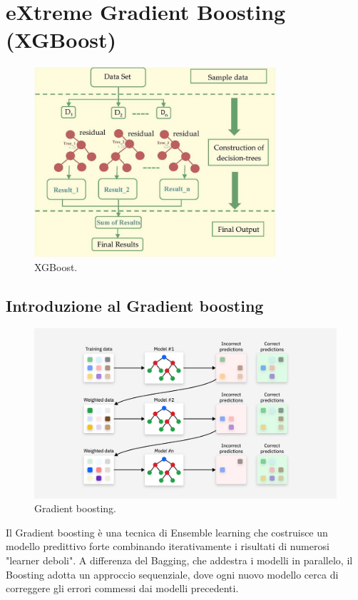 \documentclass[a4paper,12pt]{report}
\begin{document}
	\chapter{eXtreme Gradient Boosting (XGBoost)}
	\begin{figure}[H]
		\centering
		\includegraphics[width=0.8\textwidth]{img/xgb.png}
		\caption{XGBoost.}
	\end{figure}
	
	\section{Introduzione al Gradient boosting}
	\begin{figure}[H]
		\centering
		\includegraphics[width=1.0\textwidth]{img/grad_boost.png}
		\caption{Gradient boosting.}
	\end{figure}
	
	Il Gradient boosting è una tecnica di Ensemble learning che costruisce un modello predittivo forte combinando iterativamente i risultati di numerosi "learner deboli". A differenza del Bagging, che addestra i modelli in parallelo, il Boosting adotta un approccio sequenziale, dove ogni nuovo modello cerca di correggere gli errori commessi dai modelli precedenti.
	
\end{document}
